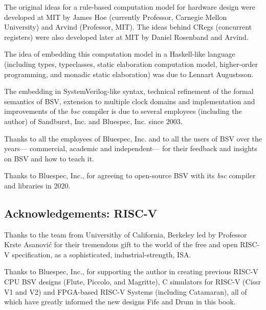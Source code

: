 The original ideas for a rule-based computation model for hardware
design were developed at MIT by James Hoe (currently Professor,
Carnegie Mellon University) and Arvind (Professor, MIT).  The ideas
behind CRegs (concurrent registers) were also developed later at MIT
by Daniel Rosenband and Arvind.

The idea of embedding this computation model in a Haskell-like
language (including types, typeclasses, static elaboration computation
model, higher-order programming, and monadic static elaboration) was
due to Lennart Augustsson.

The embedding in SystemVerilog-like syntax, technical refinement of
the formal semantics of BSV, extension to multiple clock domains and
implementation and improvements of the \emph{bsc} compiler is due to
several employees (including the author) of Sandburst, Inc. and
Bluespec, Inc. since 2003.

Thanks to all the employees of Bluespec, Inc. and to all the users of
BSV over the years--- commercial, academic and independent--- for
their feedback and insights on BSV and how to teach it.

Thanks to Bluespec, Inc., for agreeing to open-source BSV with its
\emph{bsc} compiler and libraries in 2020.

\noindent
\subsection*{Acknowledgements: RISC-V}

Thanks to the team from Universithy of California, Berkeley led by
Professor Krste {Asanovi\'c} for their tremendous gift to the world of
the free and open RISC-V specification, as a sophisticated,
industrial-strength, ISA.

Thanks to Bluespec, Inc., for supporting the author in creating
previous RISC-V CPU BSV designs (Flute, Piccolo, and Magritte), C
simulators for RISC-V (Cissr V1 and V2) and FPGA-based RISC-V Systems
(including Catamaran), all of which have greatly informed the new
designs Fife and Drum in this book.


% 



